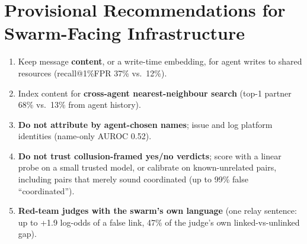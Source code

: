 \documentclass[10.5pt]{article}
\begin{document}
\section{Provisional Recommendations for Swarm-Facing Infrastructure}
\label{app:recs}
\begin{enumerate}
\item Keep message \textbf{content}, or a write-time embedding, for agent writes to shared resources (recall@1\%FPR 37\% vs.\ 12\%).
\item Index content for \textbf{cross-agent nearest-neighbour search} (top-1 partner 68\% vs.\ 13\% from agent history).
\item \textbf{Do not attribute by agent-chosen names}; issue and log platform identities (name-only AUROC 0.52).
\item \textbf{Do not trust collusion-framed yes/no verdicts}; score with a linear probe on a small trusted model, or calibrate on known-unrelated pairs, including pairs that merely sound coordinated (up to 99\% false ``coordinated'').
\item \textbf{Red-team judges with the swarm's own language} (one relay sentence: up to +1.9 log-odds of a false link, 47\% of the judge's own linked-vs-unlinked gap).
\end{enumerate}
\end{document}
